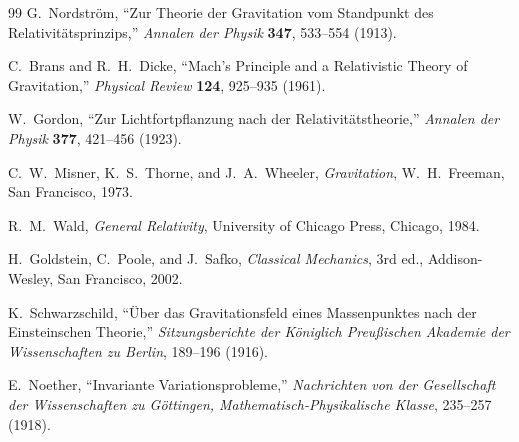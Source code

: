 \documentclass[12pt]{article}
\begin{document}
\begin{thebibliography}{99}
G.~Nordstr\"om,
``Zur Theorie der Gravitation vom Standpunkt des
Relativit\"atsprinzips,''
\textit{Annalen der Physik} \textbf{347}, 533--554 (1913).

C.~Brans and R.~H.~Dicke,
``Mach's Principle and a Relativistic Theory of Gravitation,''
\textit{Physical Review} \textbf{124}, 925--935 (1961).


W.~Gordon,
``Zur Lichtfortpflanzung nach der Relativit\"atstheorie,''
\textit{Annalen der Physik} \textbf{377}, 421--456 (1923).


C.~W.~Misner, K.~S.~Thorne, and J.~A.~Wheeler,
\textit{Gravitation},
W.~H.~Freeman, San Francisco, 1973.

R.~M.~Wald,
\textit{General Relativity},
University of Chicago Press, Chicago, 1984.


H.~Goldstein, C.~Poole, and J.~Safko,
\textit{Classical Mechanics},
3rd ed., Addison-Wesley, San Francisco, 2002.


K.~Schwarzschild,
``\"Uber das Gravitationsfeld eines Massenpunktes nach der
Einsteinschen Theorie,''
\textit{Sitzungsberichte der K\"oniglich Preu{\ss}ischen Akademie der
Wissenschaften zu Berlin},
189--196 (1916).


E.~Noether,
``Invariante Variationsprobleme,''
\textit{Nachrichten von der Gesellschaft der Wissenschaften zu
G\"ottingen, Mathematisch-Physikalische Klasse},
235--257 (1918).


\end{thebibliography}
\end{document}
